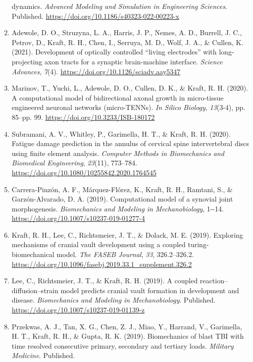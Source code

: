 \documentclass[
]{article}
\begin{document}
\begin{enumerate}
  dynamics. \emph{Advanced Modeling and Simulation in Engineering
  Sciences}. Published. \url{https://doi.org/10.1186/s40323-022-00223-x}
\item
  Adewole, D. O., Struzyna, L. A., Harris, J. P., Nemes, A. D., Burrell,
  J. C., Petrov, D., Kraft, R. H., Chen, I., Serruya, M. D., Wolf, J.
  A., \& Cullen, K. (2021). Development of optically controlled ``living
  electrodes'' with long-projecting axon tracts for a synaptic
  brain-machine interface. \emph{Science Advances}, \emph{7}(4).
  \url{https://doi.org/10.1126/sciadv.aay5347}
\item
  Marinov, T., Yuchi, L., Adewole, D. O., Cullen, D. K., \& Kraft, R. H.
  (2020). A computational model of bidirectional axonal growth in
  micro-tissue engineered neuronal networks (micro-TENNs). \emph{In
  Silico Biology}, \emph{13}(3-4), pp. 85--pp. 99.
  \url{https://doi.org/10.3233/ISB-180172}
\item
  Subramani, A. V., Whitley, P., Garimella, H. T., \& Kraft, R. H.
  (2020). Fatigue damage prediction in the annulus of cervical spine
  intervertebral discs using finite element analysis. \emph{Computer
  Methods in Biomechanics and Biomedical Engineering}, \emph{23}(11),
  773--784. \url{https://doi.org/10.1080/10255842.2020.1764545}
\item
  Carrera-Pinzón, A. F., Márquez-Flórez, K., Kraft, R. H., Ramtani, S.,
  \& Garzón-Alvarado, D. A. (2019). Computational model of a synovial
  joint morphogenesis. \emph{Biomechanics and Modeling in
  Mechanobiology}, 1-\/-14.
  \url{https://doi.org/10.1007/s10237-019-01277-4}
\item
  Kraft, R. H., Lee, C., Richtsmeier, J. T., \& Dolack, M. E. (2019).
  Exploring mechanisms of cranial vault development using a coupled
  turing-biomechanical model. \emph{The FASEB Journal}, \emph{33},
  326.2--326.2.
  \url{https://doi.org/10.1096/fasebj.2019.33.1_supplement.326.2}
\item
  Lee, C., Richtsmeier, J. T., \& Kraft, R. H. (2019). A coupled
  reaction--diffusion--strain model predicts cranial vault formation in
  development and disease. \emph{Biomechanics and Modeling in
  Mechanobiology}. Published.
  \url{https://doi.org/10.1007/s10237-019-01139-z}
\item
  Przekwas, A. J., Tan, X. G., Chen, Z. J., Miao, Y., Harrand, V.,
  Garimella, H. T., Kraft, R. H., \& Gupta, R. K. (2019). Biomechanics
  of blast TBI with time resolved consecutive primary, secondary and
  tertiary loads. \emph{Military Medicine}. Published.

\end{enumerate}
\end{document}
